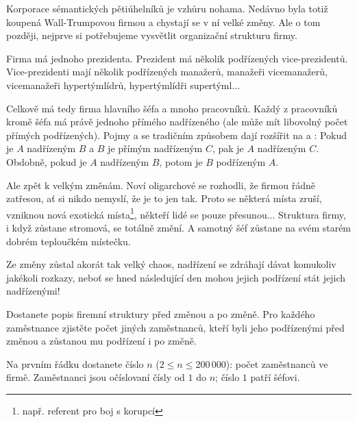 
\usepackage[czech]{babel}





Korporace sémantických pětiúhelníků je vzhůru nohama. Nedávno byla totiž koupená
Wall-Trumpovou firmou a chystají se v ní velké změny. Ale o tom později, nejprve
si potřebujeme vysvětlit organizační strukturu firmy.

Firma má jednoho prezidenta. Prezident má několik podřízených vice-prezidentů.
Vice-prezidenti mají několik podřízených manažerů, manažeři vicemanažerů,
vicemanažeři hypertýmlídrů, hypertýmlídři supertýml...

Celkově má tedy firma hlavního šéfa a mnoho pracovníků. Každý z pracovníků kromě
šéfa má právě jednoho přímého nadřízeného (ale může mít libovolný počet přímých
podřízených). Pojmy  a  se tradičním
způsobem dají rozšířit na  a : Pokud je $A$
nadřízeným $B$ a $B$ je přímým nadřízeným $C$, pak je $A$ nadřízeným $C$. Obdobně,
pokud je $A$ nadřízeným $B$, potom je $B$ podřízeným $A$.

Ale zpět k velkým změnám. Noví oligarchové se rozhodli, že firmou řádně zatřesou,
ať si nikdo nemyslí, že je to jen tak. Proto se některá místa zruší, vzniknou
nová exotická místa\footnote{např. referent pro boj s korupcí}, někteří lidé se
pouze přesunou... Struktura firmy, i když zůstane stromová, se totálně změní. A
samotný šéf zůstane na svém starém dobrém teploučkém místečku.

Ze změny zůstal akorát tak velký chaos, nadřízení se zdráhají dávat komukoliv
jakékoli rozkazy, neboť se hned následující den mohou jejich podřízení stát
jejich nadřízenými!


Dostanete popis firemní struktury před změnou a po změně. Pro každého zaměstnance
zjistěte počet jiných zaměstnanců, kteří byli jeho podřízenými před změnou a
zůstanou mu podřízení i po změně.


Na prvním řádku dostanete číslo $n$ ($2 \leq n \leq 200\,000$): počet zaměstnanců ve firmě.
Zaměstnanci jsou očíslovaní čísly od $1$ do $n$; číslo $1$ patří šéfovi.

